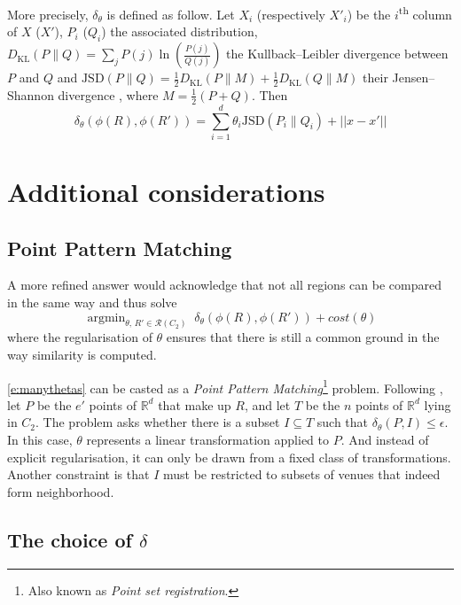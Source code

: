 \documentclass[a4paper,11pt,draft]{scrartcl}
\DeclareMathOperator*{\argmin}{argmin}
\newcommand{\vnorm}[1]{\left|\left|#1\right|\right|}
\newcommand{\autocite}[1]{}
\newcommand{\textcite}[1]{}
\begin{document}
More precisely, $\delta_{\theta}$ is defined as follow. Let $X_i$ (respectively
$X'_i$) be the $i$\textsuperscript{th} column of $X$ ($X'$), $P_i$ ($Q_i$) the
associated distribution, $D_{\mathrm{KL}}(P \parallel Q) = \sum_j
P(j)\ln\left(\frac{P(j)}{Q(j)}\right)$ the Kullback--Leibler divergence
between $P$ and $Q$ and $ \mathrm{JSD}(P \parallel Q)=
\frac{1}{2}D_{\mathrm{KL}}(P \parallel M)+\frac{1}{2}D_{\mathrm{KL}}(Q
\parallel M)$ their Jensen--Shannon divergence \autocite{JensenShannon03},
where $M=\frac{1}{2}(P+Q)$. Then
\[
	\delta_{\theta} \left(\phi(R), \phi(R')\right) = \sum_{i=1}^d
	\theta_i \mathrm{JSD}(P_i \parallel Q_i) + \vnorm{x - x'}
\]

\section*{Additional considerations}
\subsection*{Point Pattern Matching}

A more refined answer would acknowledge that not all regions can be compared in
the same way and thus solve
\begin{equation}
    \argmin_{\theta ,\, R' \in \mathcal{R}(C_2)}\; \delta_{\theta}
    \left(\phi(R), \phi(R')\right) + cost(\theta)
    \label{e:manythetas}
\end{equation}
where the regularisation of $\theta$ ensures that there is still a common
ground in the way similarity is computed.

\eqref{e:manythetas} can be casted as a \emph{Point Pattern
Matching}\footnote{Also known as \emph{Point set registration}.} problem.
Following \textcite{PointPatternMatching08}, let $P$ be the $e'$ points of
$\mathbb{R}^d$ that make up $R$, and let $T$ be the $n$ points of
$\mathbb{R}^d$ lying in $C_2$. The problem asks whether there is a subset $I
\subseteq T$ such that $\delta_{\theta}\left(P, I\right) \leq \epsilon$. In
this case, $\theta$ represents a linear transformation applied to $P$. And
instead of explicit regularisation, it can only be drawn from a fixed class of
transformations. Another constraint is that $I$ must be restricted to subsets
of venues that indeed form neighborhood.

\subsection*{The choice of $\delta$}
\end{document}
